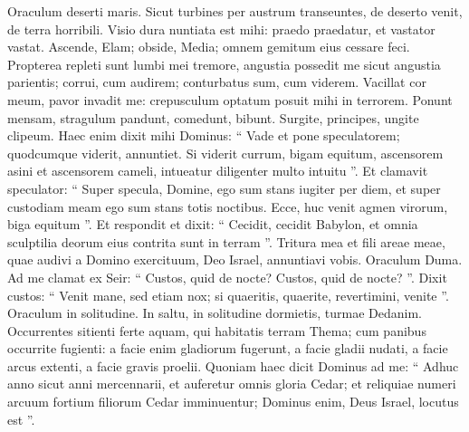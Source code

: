 \begin{biblechapter}
\begin{biblechapter}
\begin{biblechapter}
\begin{biblechapter}
\begin{biblechapter}
\begin{biblechapter}
\begin{biblechapter}
\begin{biblechapter}
\begin{biblechapter}
\begin{biblechapter}
\begin{biblechapter}
\begin{biblechapter}
\begin{biblechapter}
\begin{biblechapter}
\begin{biblechapter}
\begin{biblechapter}
\begin{biblechapter}
\begin{biblechapter}
\begin{biblechapter}
\begin{biblechapter}
\begin{biblechapter}
\verse Oraculum deserti maris.
 Sicut turbines per austrum transeuntes,
 de deserto venit, de terra horribili.
 \verse Visio dura nuntiata est mihi:
 praedo praedatur,
 et vastator vastat.
 Ascende, Elam;
 obside, Media;
 omnem gemitum eius cessare feci.
 \verse Propterea repleti sunt lumbi mei tremore,
 angustia possedit me sicut angustia parientis;
 corrui, cum audirem;
 conturbatus sum, cum viderem.
 \verse Vacillat cor meum,
 pavor invadit me:
 crepusculum optatum
 posuit mihi in terrorem.
 \verse Ponunt mensam,
 stragulum pandunt, comedunt, bibunt.
 Surgite, principes,
 ungite clipeum.
 \verse Haec enim dixit mihi Dominus:
 “ Vade et pone speculatorem;
 quodcumque viderit, annuntiet.
 \verse Si viderit currum, bigam equitum,
 ascensorem asini et ascensorem cameli,
 intueatur diligenter multo intuitu ”.
 \verse Et clamavit speculator:
 “ Super specula, Domine,
 ego sum stans iugiter per diem,
 et super custodiam meam
 ego sum stans totis noctibus.
 \verse Ecce, huc venit agmen virorum,
 biga equitum ”.
 Et respondit et dixit:
 “ Cecidit, cecidit Babylon,
 et omnia sculptilia deorum eius
 contrita sunt in terram ”.
 \verse Tritura mea et fili areae meae,
 quae audivi a Domino exercituum, Deo Israel,
 annuntiavi vobis.
 \verse Oraculum Duma.
 Ad me clamat ex Seir:
 “ Custos, quid de nocte?
 Custos, quid de nocte? ”.
 \verse Dixit custos:
 “ Venit mane, sed etiam nox;
 si quaeritis, quaerite,
 revertimini, venite ”.
 \verse Oraculum in solitudine.
 In saltu, in solitudine dormietis,
 turmae Dedanim.
 \verse Occurrentes sitienti ferte aquam,
 qui habitatis terram Thema;
 cum panibus occurrite fugienti:
 \verse a facie enim gladiorum fugerunt,
 a facie gladii nudati,
 a facie arcus extenti,
 a facie gravis proelii.
 \verse Quoniam haec dicit Dominus ad me: “ Adhuc anno sicut anni mercennarii, et auferetur omnis gloria Cedar; 
\verse et reliquiae numeri arcuum fortium filiorum Cedar imminuentur; Dominus enim, Deus Israel, locutus est ”.
 

\end{biblechapter}
\end{biblechapter}
\end{biblechapter}
\end{biblechapter}
\end{biblechapter}
\end{biblechapter}
\end{biblechapter}
\end{biblechapter}
\end{biblechapter}
\end{biblechapter}
\end{biblechapter}
\end{biblechapter}
\end{biblechapter}
\end{biblechapter}
\end{biblechapter}
\end{biblechapter}
\end{biblechapter}
\end{biblechapter}
\end{biblechapter}
\end{biblechapter}
\end{biblechapter}
